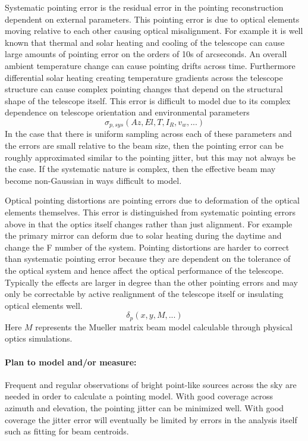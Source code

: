 Systematic pointing error is the residual error in the pointing reconstruction dependent on external parameters. This pointing error is due to optical elements moving relative to each other causing optical misalignment. For example it is well known that thermal and solar heating and cooling of the telescope can cause large amounts of pointing error on the orders of 10s of arcseconds. An overall ambient temperature change can cause pointing drifts across time. Furthermore differential solar heating creating temperature gradients across the telescope structure can cause complex pointing changes that depend on the structural shape of the telescope itself. This error is difficult to model due to its complex dependence on telescope orientation and environmental parameters
\begin{equation}
\sigma_{p,sys} \left ( Az, El, T, I_{R}, v_{w}, ... \right )
\end{equation}
In the case that there is uniform sampling across each of these parameters and the errors are small relative to the beam size, then the pointing error can be roughly approximated similar to the pointing jitter, but this may not always be the case. If the systematic nature is complex, then the effective beam may become non-Gaussian in ways difficult to model.

Optical pointing distortions are pointing errors due to deformation of the optical elements themselves. This error is distinguished from systematic pointing errors above in that the optics itself changes rather than just alignment. For example the primary mirror can deform due to solar heating during the daytime and change the F number of the system. Pointing distortions are harder to correct than systematic pointing error because they are dependent on the tolerance of the optical system and hence affect the optical performance of the telescope. Typically the effects are larger in degree than the other pointing errors and may only be correctable by active realignment of the telescope itself or insulating optical elements well.
\begin{equation}
\delta_{p} \left ( x, y, M, ... \right )
\end{equation}
Here $M$ represents the Mueller matrix beam model calculable through physical optics simulations. 

\paragraph{Plan to model and/or measure:}
Frequent and regular observations of bright point-like sources across the sky are needed in order to calculate a pointing model. With good coverage across azimuth and elevation, the pointing jitter can be minimized well. With good coverage the jitter error will eventually be limited by errors in the analysis itself such as fitting for beam centroids.

